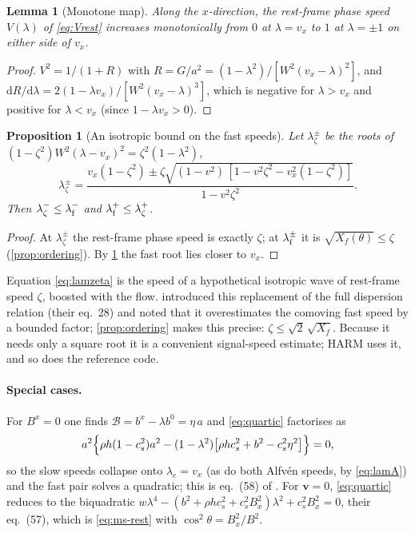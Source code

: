 \documentclass[11pt,a4paper,oneside,openany]{book}
\newcommand{\textcite}{\citet}
\theoremstyle{definition}
\theoremstyle{plain}
\newtheorem{proposition}{Proposition}[chapter]
\newtheorem{lemma}{Lemma}[chapter]
\theoremstyle{remark}
\newcommand{\dd}{\mathrm{d}}
\newcommand{\vv}{\bm{v}}
\newcommand{\calB}{\mathcal{B}}
\newcommand{\vB}{\eta}
\begin{document}
\begin{lemma}[Monotone map]\label{lem:monotone}
Along the $x$-direction, the rest-frame phase speed $V(\lambda)$ of \eqref{eq:Vrest}
increases monotonically from $0$ at $\lambda=v_x$ to $1$ at $\lambda=\pm1$ on either side
of $v_x$.
\end{lemma}
\begin{proof}
$V^2=1/(1+R)$ with $R=G/a^2=(1-\lambda^2)/[W^2(v_x-\lambda)^2]$, and
$\dd R/\dd\lambda=2(1-\lambda v_x)/[W^2(v_x-\lambda)^3]$, which is negative for
$\lambda>v_x$ and positive for $\lambda<v_x$ (since $1-\lambda v_x>0$).
\end{proof}

\begin{proposition}[An isotropic bound on the fast speeds]\label{prop:fastbound}
Let $\lambda_\zeta^\pm$ be the roots of $(1-\zeta^2)W^2(\lambda-v_x)^2=\zeta^2(1-\lambda^2)$,
\begin{equation}\label{eq:lamzeta}
\lambda_\zeta^\pm=\frac{v_x(1-\zeta^2)\pm\zeta\sqrt{(1-v^2)\,[1-v^2\zeta^2-v_x^2(1-\zeta^2)]}}
{1-v^2\zeta^2}.
\end{equation}
Then $\lambda_\zeta^-\le\lambda_{\rm f}^-$ and $\lambda_{\rm f}^+\le\lambda_\zeta^+$.
\end{proposition}
\begin{proof}
At $\lambda_\zeta^\pm$ the rest-frame phase speed is exactly $\zeta$; at $\lambda_{\rm
f}^\pm$ it is $\sqrt{X_f(\theta)}\le\zeta$ (\cref{prop:ordering}). By
\cref{lem:monotone} the fast root lies closer to $v_x$.
\end{proof}

Equation \eqref{eq:lamzeta} is the speed of a hypothetical isotropic wave of rest-frame
speed $\zeta$, boosted with the flow. \textcite{GammieMcKinneyToth2003} introduced this
replacement of the full dispersion relation (their eq.~28) and noted that it overestimates
the comoving fast speed by a bounded factor; \cref{prop:ordering} makes this precise:
$\zeta\le\sqrt2\,\sqrt{X_f}$. Because it needs only a square root it is a convenient
signal-speed estimate; HARM uses it, and so does the reference code.

\paragraph{Special cases.} For $B^x=0$ one finds $\calB=b^x-\lambda b^0=\vB\,a$ and
\eqref{eq:quartic} factorises as
\begin{equation}\label{eq:quad-bx0}
a^2\Bigl\{\rho h(1-c_s^2)a^2-(1-\lambda^2)\bigl[\rho hc_s^2+b^2-c_s^2\vB^2\bigr]\Bigr\}=0,
\end{equation}
so the slow speeds collapse onto $\lambda_e=v_x$ (as do both Alfvén speeds, by
\eqref{eq:lamA}) and the fast pair solves a quadratic; this is eq.~(58) of
\textcite{MignoneBodo2006}. For $\vv=0$, \eqref{eq:quartic} reduces to the biquadratic
$w\lambda^4-(b^2+\rho hc_s^2+c_s^2B_x^2)\lambda^2+c_s^2B_x^2=0$, their eq.~(57), which is
\eqref{eq:ms-rest} with $\cos^2\theta=B_x^2/B^2$.
\end{document}
